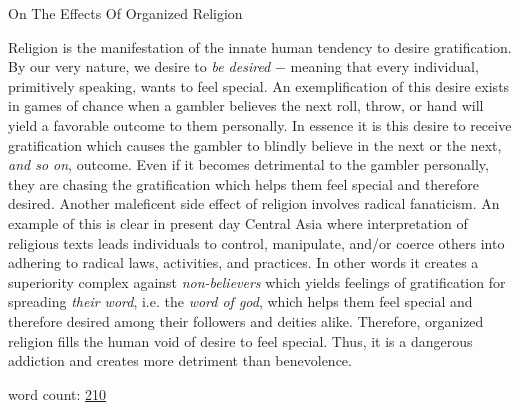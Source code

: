 \documentclass{letter}
\begin{document}
\begin{center}
On The Effects Of Organized Religion
\end{center}
\justifying Religion is the manifestation of the innate human tendency to desire gratification. By our very nature, we desire to \textit{be desired} $-$ meaning that every individual, primitively speaking, wants to feel special. An exemplification of this desire exists in games of chance when a gambler believes the next roll, throw, or hand will yield a favorable outcome to them personally. In essence it is this desire to receive gratification which causes the gambler to blindly believe in the next or the next, \textit{and so on}, outcome. Even if it becomes detrimental to the gambler personally, they are chasing the gratification which helps them feel special and therefore desired. Another maleficent side effect of religion involves radical fanaticism. An example of this is clear in present day Central Asia where interpretation of religious texts leads individuals to control, manipulate, and/or coerce others into adhering to radical laws, activities, and practices. In other words it creates a superiority complex against \textit{non-believers} which yields feelings of gratification for spreading \textit{their word}, i.e. the \textit{word of god}, which helps them feel special and therefore desired among their followers and deities alike. Therefore, organized religion fills the human void of desire to feel special. Thus, it is a dangerous addiction and creates more detriment than benevolence.
\begin{center}
word count: \underline{210}
\end{center}
\end{document}
